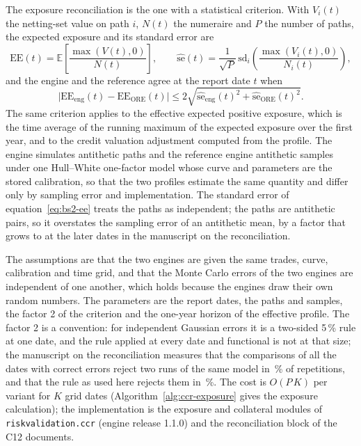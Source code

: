 The exposure reconciliation is the one with a statistical criterion. With $V_i(t)$ the netting-set value on path $i$, $N(t)$ the numeraire
and $P$ the number of paths, the expected exposure and its standard error are
\begin{equation}
\mathrm{EE}(t)=\mathbb E\!\left[\frac{\max(V(t),0)}{N(t)}\right],\qquad
\widehat{\mathrm{se}}(t)=\frac{1}{\sqrt{P}}\,\mathrm{sd}_i\!\left(\frac{\max(V_i(t),0)}{N_i(t)}\right),
\label{eq:bs2-ee}
\end{equation}
and the engine and the reference agree at the report date $t$ when
\begin{equation}
\big|\mathrm{EE}_{\mathrm{eng}}(t)-\mathrm{EE}_{\mathrm{ORE}}(t)\big|\le 2\sqrt{\widehat{\mathrm{se}}_{\mathrm{eng}}(t)^{2}+\widehat{\mathrm{se}}_{\mathrm{ORE}}(t)^{2}}.
\label{eq:bs2-agree}
\end{equation}
The same criterion applies to the effective expected positive exposure, which is the time average of the running maximum of the expected
exposure over the first year, and to the credit valuation adjustment computed from the profile. The engine simulates \pxTwoEnginePaths{} antithetic
paths and the reference engine \pxTwoOreSamples{} antithetic samples under one Hull--White one-factor model whose curve and parameters are the stored
calibration, so that the two profiles estimate the same quantity and differ only by sampling error and implementation. The standard error of
equation~\eqref{eq:bs2-ee} treats the paths as independent; the paths are antithetic pairs, so it overstates the sampling error of an antithetic mean,
by a factor that grows to \pxPpTwoOverstate{} at the later dates in the manuscript on the reconciliation.

The assumptions are that the two engines are given the same trades, curve, calibration and time grid, and that the Monte Carlo errors of the two engines are
independent of one another, which holds because the engines draw their own random numbers. The parameters are the \pxTwoSingleDates{} report dates, the
\pxTwoEnginePaths{} paths and \pxTwoOreSamples{} samples, the factor 2 of the criterion and the one-year horizon of the effective profile. The factor 2 is a convention:
for independent Gaussian errors it is a two-sided 5\,\% rule at one date, and the rule applied at every date and functional is not at that size; the manuscript
on the reconciliation measures that the comparisons of all the dates with correct errors reject two runs of the same model in \pxPpTwoSizeFamily{}\,\% of
repetitions, and that the rule as used here rejects them in \pxPpTwoSizeProd{}\,\%. The cost is $O(P\,K)$ per variant for $K$ grid dates
(Algorithm~\ref{alg:ccr-exposure} gives the exposure calculation); the implementation is the exposure and collateral modules of \texttt{riskvalidation.ccr}
(engine release 1.1.0) and the reconciliation block of the C12 documents.

